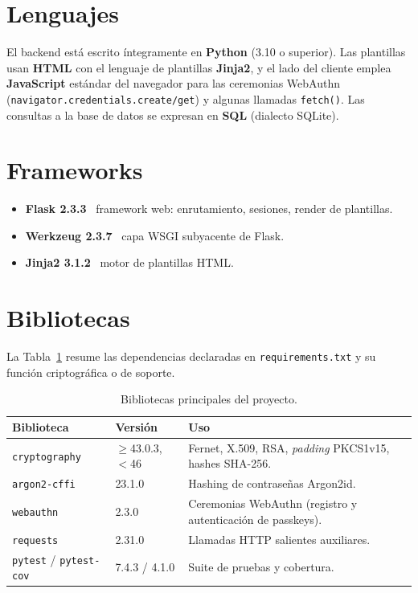 \documentclass[10pt,letterpaper]{report}
\begin{document}
\section{Lenguajes}
El backend est\'a escrito \'integramente en \textbf{Python} (3.10 o superior). Las plantillas usan
\textbf{HTML} con el lenguaje de plantillas \textbf{Jinja2}, y el lado del cliente emplea
\textbf{JavaScript} est\'andar del navegador para las ceremonias WebAuthn
(\texttt{navigator.credentials.create/get}) y algunas llamadas \texttt{fetch()}. Las consultas a la
base de datos se expresan en \textbf{SQL} (dialecto SQLite).

\section{Frameworks}
\begin{itemize}
  \item \textbf{Flask 2.3.3} \textemdash\ framework web: enrutamiento, sesiones, render de plantillas.
  \item \textbf{Werkzeug 2.3.7} \textemdash\ capa WSGI subyacente de Flask.
  \item \textbf{Jinja2 3.1.2} \textemdash\ motor de plantillas HTML.
\end{itemize}

\section{Bibliotecas}
La Tabla~\ref{tab:stack} resume las dependencias declaradas en \texttt{requirements.txt} y su
funci\'on criptogr\'afica o de soporte.

\begin{table}[h]
\centering
\renewcommand{\arraystretch}{1.25}
\begin{tabularx}{\textwidth}{l l X}
\toprule
\textbf{Biblioteca} & \textbf{Versi\'on} & \textbf{Uso} \\
\midrule
\texttt{cryptography} & $\geq$43.0.3,$<$46 & Fernet, X.509, RSA, \emph{padding} PKCS1v15, hashes SHA-256. \\
\texttt{argon2-cffi} & 23.1.0 & Hashing de contrase\~nas Argon2id. \\
\texttt{webauthn} & 2.3.0 & Ceremonias WebAuthn (registro y autenticaci\'on de passkeys). \\
\texttt{requests} & 2.31.0 & Llamadas HTTP salientes auxiliares. \\
\texttt{pytest} / \texttt{pytest-cov} & 7.4.3 / 4.1.0 & Suite de pruebas y cobertura. \\
\bottomrule
\end{tabularx}
\caption{Bibliotecas principales del proyecto.}
\label{tab:stack}
\end{table}
\end{document}
